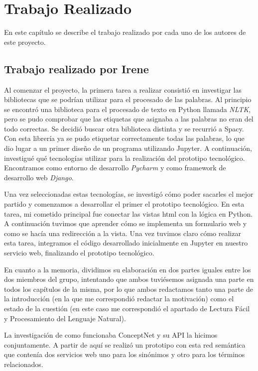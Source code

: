 \chapter{Trabajo Realizado}
\label{cap:TrabajoRealizado}


En este capítulo se describe el trabajo realizado por cada uno de los autores de este proyecto.


\section{Trabajo realizado por Irene}
\label{cap:sec:trabajo_Irene}

Al comenzar el proyecto, la primera tarea a realizar consistió en investigar las bibliotecas que se podrían utilizar para el procesado de las palabras. Al principio se encontró una biblioteca para el procesado de texto en Python llamada \textit{NLTK}, pero se pudo comprobar que las etiquetas que asignaba a las palabras no eran del todo correctas. Se decidió buscar otra biblioteca distinta y se recurrió a Spacy. Con esta librería ya se pudo etiquetar correctamente todas las palabras, lo que dio lugar a un primer diseño de un programa utilizando Jupyter. A continuación, investigué qué tecnologías utilizar para la realización del prototipo tecnológico. Encontramos como entorno de desarrollo \textit{Pycharm} y como framework de desarrollo web \textit{Django}. 

Una vez seleccionadas estas tecnologías, se investigó cómo poder sacarles el mejor partido y comenzamos a desarrollar el primer el prototipo tecnológico.
En esta tarea, mi cometido principal fue conectar las vistas html con la lógica en Python. A continuación tuvimos que aprender cómo se implementa un formulario web y como se hacía una redirección a la vista. Una vez tuvimos claro cómo realizar esta tarea, integramos el código desarrollado inicialmente en Jupyter en nuestro servicio web, finalizando el prototipo tecnológico.

En cuanto a la memoria, dividimos su elaboración en dos partes iguales entre los dos miembros del grupo, intentando que ambos tuviésemos asignada una parte en todos los capítulos de la misma, por lo que ambos redactamos tanto una parte de la introducción (en la que me correspondió redactar la motivación) como el estado de la cuestión (en este caso me correspondió el apartado de Lectura Fácil y Procesamiento del Lenguaje Natural).

La investigación de como funcionaba ConceptNet y su API la hicimos conjuntamente. A partir de aquí se realizó un prototipo con esta red semántica que contenía dos servicios web uno para los sinónimos y otro para los términos relacionados. 

